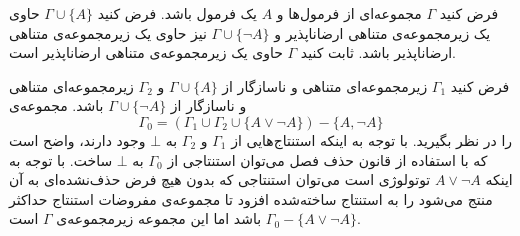 فرض کنید $\Gamma$ مجموعه‌ای از فرمول‌ها و $A$ یک فرمول باشد. فرض کنید $\Gamma\cup \{A\}$ حاوی یک زیرمجموعه‌ی متناهی ارضاناپذیر و $\Gamma\cup\{\neg A\}$ نیز حاوی یک زیرمجموعه‌ی متناهی ارضاناپذیر باشد. ثابت کنید $\Gamma$ حاوی یک زیرمجموعه‌ی متناهی ارضاناپذیر است.
\begin{ans}
  فرض کنید $\Gamma_1$ زیرمجموعه‌ای متناهی و ناسازگار از
  $\Gamma\cup \{A\}$
  و
  $\Gamma_2$
  زیرمجموعه‌ای متناهی و ناسازگار از
  $\Gamma\cup\{\neg A\}$
  باشد. مجموعه‌ی
  $$\Gamma_0=(\Gamma_1\cup\Gamma_2\cup\{A\vee\neg A\})-\{A,\neg A\}$$
  را در نظر بگیرید. با توجه به اینکه استنتاج‌هایی از $\Gamma_1$ و $\Gamma_2$ به $\bot$ وجود دارند، واضح است که با استفاده از قانون حذف فصل می‌توان استنتاجی از $\Gamma_0$ به $\bot$ ساخت. با توجه به اینکه $A\vee\neg A$ توتولوژی است می‌توان استنتاجی که بدون هیچ فرض حذف‌نشده‌ای به آن منتج می‌شود را به استنتاج ساخته‌شده افزود تا مجموعه‌ی مفروضات استنتاج حداکثر
  $\Gamma_0-\{A\vee\neg A\}$ باشد
  اما این مجموعه زیرمجموعه‌ی $\Gamma$ است.
\end{ans}